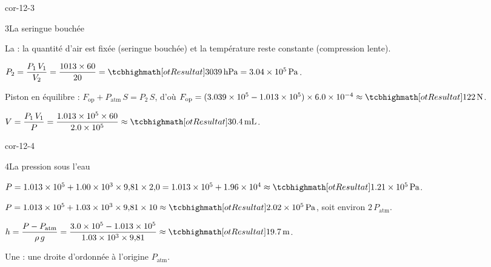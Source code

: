 \begin{blocLivre}{cor-12-3}
\begin{corrige}{3}{La seringue bouchée}
\begin{questions}
\item La  : la quantité d'air est fixée (seringue bouchée) et la température reste constante (compression lente).
\item $P_2=\dfrac{P_1\,V_1}{V_2}=\dfrac{1013\times60}{20}=\res{\qty{3039}{hPa}}=\qty{3,04e5}{Pa}$.
\item Piston en équilibre : $F_\mathrm{op}+P_\mathrm{atm}\,S=P_2\,S$, d'où $F_\mathrm{op}=(\num{3,039e5}-\num{1,013e5})\times\num{6,0e-4}\approx\res{\qty{122}{N}}$.
\item $V=\dfrac{P_1\,V_1}{P}=\dfrac{\num{1,013e5}\times60}{\num{2,0e5}}\approx\res{\qty{30,4}{mL}}$.
\end{questions}
\end{corrige}
\end{blocLivre}
\begin{blocLivre}{cor-12-4}
\begin{corrige}{4}{La pression sous l'eau}
\begin{questions}
\item $P=\num{1,013e5}+\num{1,00e3}\times9{,}81\times2{,}0=\num{1,013e5}+\num{1,96e4}\approx\res{\qty{1,21e5}{Pa}}$.
\item $P=\num{1,013e5}+\num{1,03e3}\times9{,}81\times10\approx\res{\qty{2,02e5}{Pa}}$, soit environ $2\,P_\mathrm{atm}$.
\item $h=\dfrac{P-P_\mathrm{atm}}{\rho\,g}=\dfrac{\num{3,0e5}-\num{1,013e5}}{\num{1,03e3}\times9{,}81}\approx\res{\qty{19,7}{m}}$.
\item Une  : une droite d'ordonnée à l'origine $P_\mathrm{atm}$.
\end{questions}
\end{corrige}
\end{blocLivre}
